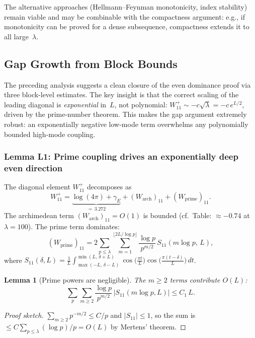 \documentclass[12pt,a4paper]{article}
\newtheorem{lemma}[theorem]{Lemma}
\theoremstyle{definition}
\theoremstyle{remark}
\begin{document}
The alternative approaches (Hellmann--Feynman monotonicity, index stability) remain viable and may be combinable with the compactness argument: e.g., if monotonicity can be proved for a dense subsequence, compactness extends it to all large~$\lambda$.

\subsection{Gap Growth from Block Bounds}
\label{sec:gap-growth-block}

The preceding analysis suggests a clean closure of the even dominance proof via three block-level estimates. The key insight is that the correct scaling of the leading diagonal is \emph{exponential} in~$L$, not polynomial: $W_{11}^+ \sim -c\sqrt{\lambda} = -c\,e^{L/2}$, driven by the prime-number theorem. This makes the gap argument extremely robust: an exponentially negative low-mode term overwhelms any polynomially bounded high-mode coupling.

\subsubsection{Lemma L1: Prime coupling drives an exponentially deep even direction}

The diagonal element $W_{11}^+$ decomposes as
\begin{equation}
\label{eq:W11-decomp}
  W_{11}^+ = \underbrace{\log(4\pi) + \gamma_E}_{=\,3.272} + (W_{\mathrm{arch}})_{11} + (W_{\mathrm{prime}})_{11}.
\end{equation}
The archimedean term $(W_{\mathrm{arch}})_{11} = O(1)$ is bounded (cf.\ Table: $\approx -0.74$ at $\lambda = 100$). The prime term dominates:
\[
  (W_{\mathrm{prime}})_{11} = 2\sum_{p \leq \lambda}\sum_{m=1}^{\lfloor 2L/\log p\rfloor} \frac{\log p}{p^{m/2}}\,S_{11}(m\log p,\,L),
\]
where $S_{11}(\delta, L) = \frac{1}{L}\int_{\max(-L,\,\delta-L)}^{\min(L,\,\delta+L)} \cos\!\bigl(\frac{\pi t}{L}\bigr)\cos\!\bigl(\frac{\pi(t-\delta)}{L}\bigr)\,dt$.

\begin{lemma}[Prime powers are negligible]
\label{lem:m1-dominance}
The $m \geq 2$ terms contribute $O(L)$:
\[
  \sum_p \sum_{m \geq 2} \frac{\log p}{p^{m/2}}\,|S_{11}(m\log p, L)| \leq C_1\,L.
\]
\end{lemma}
\begin{proof}[Proof sketch]
$\sum_{m \geq 2} p^{-m/2} \leq C/p$ and $|S_{11}| \leq 1$, so the sum is $\leq C\sum_{p \leq \lambda} (\log p)/p = O(L)$ by Mertens' theorem.
\end{proof}
\end{document}
